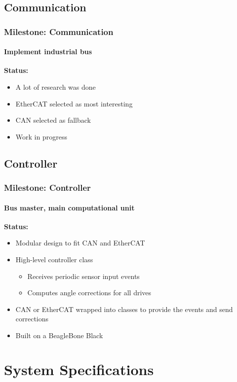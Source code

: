 \documentclass{beamer}
\begin{document}
\subsection{Communication}
\begin{frame}
  \frametitle{Milestone: Communication}
  \framesubtitle{Implement industrial bus}
  \textbf{Status:}
  \begin{itemize}
    \item A lot of research was done
    \item EtherCAT selected as most interesting
    \item CAN selected as fallback
    \item Work in progress
  \end{itemize}
\end{frame}

\subsection{Controller}
\begin{frame}
  \frametitle{Milestone: Controller}
  \framesubtitle{Bus master, main computational unit}
  \textbf{Status:}
  \begin{itemize}
    \item Modular design to fit CAN and EtherCAT
    \item High-level controller class
      \begin{itemize}
        \item Receives periodic sensor input events
        \item Computes angle corrections for all drives
      \end{itemize}
    \item CAN or EtherCAT wrapped into classes to provide the events and send corrections
    \item Built on a BeagleBone Black
  \end{itemize}
\end{frame}


\section{System Specifications}
\end{document}
